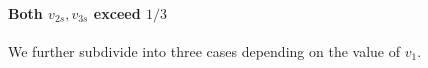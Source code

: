 \documentclass[10pt,a4paper]{amsart}
\renewcommand{\epsilon}{\varepsilon} %
\theoremstyle{definition}
\newcommand{\alg}{\mathtt{opt}_{\mathrm{gs}}}
\newcommand{\opt}{\mathtt{opt}}
\newcommand{\vtwos}{v_{2s}}
\newcommand{\vthrees}{v_{3s}}
\begin{document}





\paragraph{Both $\vtwos,\vthrees$ exceed $1/3$}
We further subdivide into three cases depending on the value of $v_1$.
\end{document}
